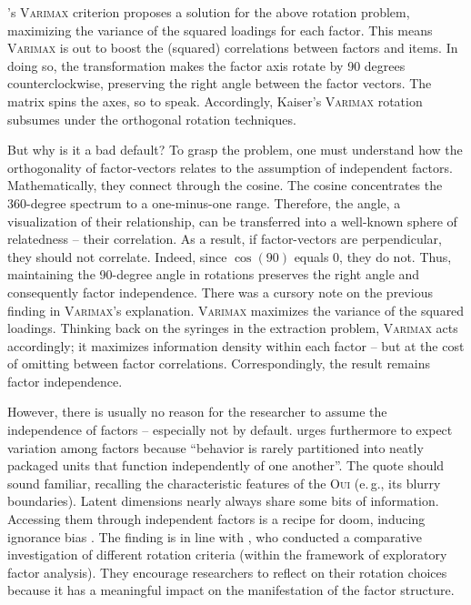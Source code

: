 \documentclass[jou, 11pt]{apa7}
\begin{document}
\textcite{Kaiser1958}'s \textsc{Varimax} criterion proposes a solution for the
above rotation problem, maximizing the variance of the squared loadings for
each factor. This means \textsc{Varimax} is out to boost the (squared)
correlations between factors and items. In doing so, the transformation makes
the factor axis rotate by 90 degrees counterclockwise, preserving the right
angle between the factor vectors. The matrix spins the axes, so to speak.
Accordingly, Kaiser’s \textsc{Varimax} rotation subsumes under the orthogonal
rotation techniques.

But why is it a bad default? To grasp the problem, one must understand how the
orthogonality of factor-vectors relates to the assumption of independent
factors. Mathematically, they connect through the cosine. The cosine
concentrates the 360-degree spectrum to a one-minus-one range. Therefore, the
angle, a visualization of their relationship, can be transferred into a
well-known sphere of relatedness -- their correlation. As a result, if
factor-vectors are perpendicular, they should not correlate. Indeed, since
$\cos(90)$ equals 0, they do not. Thus, maintaining the 90-degree angle in
rotations preserves the right angle and consequently factor independence. There
was a cursory note on the previous finding in \textsc{Varimax}'s explanation.
\textsc{Varimax} maximizes the variance of the squared loadings. Thinking back
on the syringes in the extraction problem, \textsc{Varimax} acts accordingly; it
maximizes information density within each factor -- but at the cost of omitting
between factor correlations. Correspondingly, the result remains factor
independence.

However, there is usually no reason for the researcher to assume the
independence of factors -- especially not by default.
\textcite[p. 3]{Costello2005} urges furthermore to expect variation among
factors because \enquote{behavior is rarely partitioned into neatly packaged
units that function independently of one another}. The quote should sound
familiar, recalling the characteristic features of the \textsc{Oui} (e.\,g., its blurry
boundaries). Latent dimensions nearly always share some bits of information.
Accessing them through independent factors is a recipe for doom, inducing
ignorance bias \parencite{Loo1979}. The finding is in line with
\textcite{Sass2010}, who conducted a comparative investigation of different
rotation criteria (within the framework of exploratory factor analysis). They
encourage researchers to reflect on their rotation choices because it has a
meaningful impact on the manifestation of the factor structure. 
\end{document}
